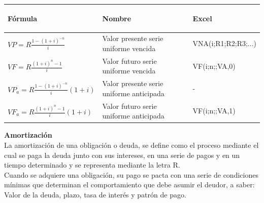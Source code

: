 \begin{spacing}{1.2}
	\begin{center}
		\begin{tabular}{ |p{4.2cm}|p{5.7cm}| p{4cm}|}
			\hline
			\rowcolor{orange!50}              %
			\begin{center}\textbf{Fórmula} \end{center}                                      & \begin{center} \textbf{Nombre}\end{center}                         & \begin{center} \textbf{Excel} \end{center} \\ \hline


			$VP = R  \frac{1-(1 + i)^{-n}}{i} $\hspace{35pt}               & Valor presente serie uniforme vencida             & VNA(i;R1;R2;R3;...)       \\ \hline


			$VF = R  \frac{(1 + i)^n-1}{i} $                               & Valor futuro serie uniforme vencida \hspace{35pt} & VF(i;n;;VA,0)             \\  \hline


			$VP_{a} = R  \frac{1-(1 + i)^{-n}}{i}  (1 + i) $ \hspace{35pt} & Valor presente serie uniforme anticipada          & -                         \\ \hline

			$VF_{a} = R  \frac{(1 + i)^n-1}{i}   (1 + i) $ \hspace{35pt}   & Valor futuro serie uniforme anticipada            & VF(i;n;;VA,1)             \\ \hline
		\end{tabular}
	\end{center}
\end{spacing}
\textbf{Amortización}\\

La amortización de una obligación o deuda, se define como el proceso mediante el cual se paga la deuda junto con sus intereses, en una serie de pagos y en un tiempo determinado y se representa mediante la letra R.\\

Cuando se adquiere una obligación, su pago se pacta con una serie de condiciones mínimas que determinan el comportamiento que debe asumir el deudor,  a saber: Valor de la deuda, plazo, tasa de interés y patrón de pago.\\


